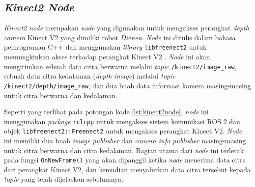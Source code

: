\subsection{\emph{Kinect2 Node}}
\label{subsec:kinect2node}

\emph{Kinect2 node} merupakan \emph{node} yang digunakan untuk mengakses perangkat \emph{depth camera} Kinect V2 yang dimiliki robot \emph{Dienen}.
\emph{Node} ini ditulis dalam bahasa pemrograman C++ dan menggunakan \emph{library} \lstinline{libfreenect2} untuk memungkinkan akses terhadap perangkat Kinect V2 \citep{sft:libfreenect2}.
\emph{Node} ini akan mengirimkan sebuah data citra berwarna melalui \emph{topic} \lstinline{/kinect2/image_raw},
  sebuah data citra kedalaman (\emph{depth image}) melalui \emph{topic} \lstinline{/kinect2/depth/image_raw},
  dan dua buah data informasi kamera masing-masing untuk citra berwarna dan kedalaman.



Seperti yang terlihat pada potongan kode \ref{lst:kinect2node},
  \emph{node} ini menggunakan \emph{package} \lstinline{rclcpp} untuk mengakses sistem komunikasi ROS 2 dan objek \lstinline{libfreenect2::Freenect2} untuk mengakses perangkat Kinect V2.
\emph{Node} ini memiliki dua buah \emph{image publisher} dan \emph{camera info publisher} masing-masing untuk citra berwarna dan citra kedalaman.
Bagian utama dari \emph{node} ini terletak pada fungsi \lstinline{OnNewFrame()} yang akan dipanggil ketika \emph{node} menerima data citra dari perangkat Kinect V2,
  dan kemudian menyalurkan data citra tersebut kepada \emph{topic} yang telah dijelaskan sebelumnya.
